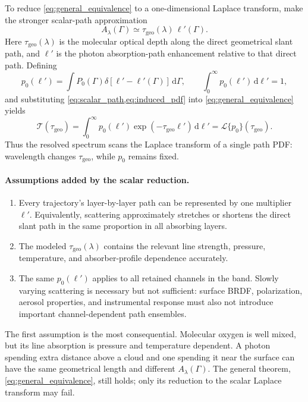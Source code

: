 \documentclass[11pt]{article}
\newcommand{\dd}{\,\mathrm{d}}
\newcommand{\taugeo}{\tau_{\mathrm{geo}}}
\newcommand{\lp}{\ell'}
\begin{document}
To reduce \cref{eq:general_equivalence} to a one-dimensional Laplace transform,
make the stronger scalar-path approximation
\begin{equation}
  A_\lambda(\Gamma)
  \simeq \taugeo(\lambda)\,\lp(\Gamma).
  \label{eq:scalar_path}
\end{equation}
Here $\taugeo(\lambda)$ is the molecular optical depth along the direct
geometrical slant path, and $\lp$ is the photon absorption-path enhancement
relative to that direct path.  Defining
\begin{equation}
  p_0(\lp)
  = \int P_0(\Gamma)
      \delta\!\left[\lp-\lp(\Gamma)\right]\dd\Gamma,
  \qquad
  \int_0^\infty p_0(\lp)\dd\lp=1,
  \label{eq:induced_pdf}
\end{equation}
and substituting \cref{eq:scalar_path,eq:induced_pdf} into
\cref{eq:general_equivalence} yields
\begin{equation}
  \mathcal T(\taugeo)
  = \int_0^\infty p_0(\lp)
      \exp(-\taugeo\lp)\dd\lp
  = \mathcal L\{p_0\}(\taugeo).
  \label{eq:laplace}
\end{equation}
Thus the resolved spectrum scans the Laplace transform of a single path PDF:
wavelength changes $\taugeo$, while $p_0$ remains fixed.

\paragraph{Assumptions added by the scalar reduction.}
\begin{enumerate}
  \item Every trajectory's layer-by-layer path can be represented by one
        multiplier $\lp$.  Equivalently, scattering approximately stretches or
        shortens the direct slant path in the same proportion in all absorbing
        layers.
  \item The modeled $\taugeo(\lambda)$ contains the relevant line strength,
        pressure, temperature, and absorber-profile dependence accurately.
  \item The same $p_0(\lp)$ applies to all retained channels in the band.
        Slowly varying scattering is necessary but not sufficient: surface
        BRDF, polarization, aerosol properties, and instrumental response must
        also not introduce important channel-dependent path ensembles.
\end{enumerate}

The first assumption is the most consequential.  Molecular oxygen is well
mixed, but its line absorption is pressure and temperature dependent.  A
photon spending extra distance above a cloud and one spending it near the
surface can have the same geometrical length and different
$A_\lambda(\Gamma)$.  The general theorem, \cref{eq:general_equivalence}, still
holds; only its reduction to the scalar Laplace transform may fail.
\end{document}

